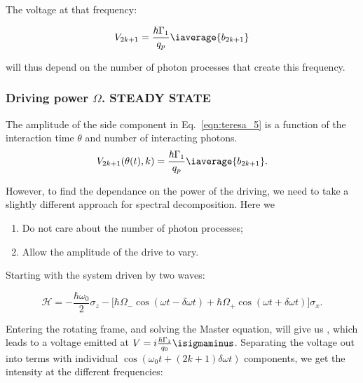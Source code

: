       The voltage at that frequency:
	
	\begin{equation}\label{eqn:teresa_5}
          V_{2k+1}=\frac{\hbar\Gamma_1}{q_p}\iaverage{b_{2k+1}}
	\end{equation}
	
	\noindent will thus depend  on the number of photon
        processes that create this frequency.
	
	
 \subsubsection{Driving power $ \Omega $. STEADY STATE}
 The    amplitude     of    the    side     component    in
 Eq.~\eqref{eqn:teresa_5} is a  function of the interaction
 time $ \theta $ and number of interacting photons.
 \[
   V_{2k+1}(\theta(t),
   k)=\frac{\hbar\Gamma_1}{q_p}\iaverage{b_{2k+1}}.
 \]
  
 \noindent However, to find the  dependance on the power of
 the driving, we need to take a slightly different approach
 for spectral decomposition. Here we
  
 \begin{enumerate}
 \item Do not care about the number of photon processes;
 \item Allow the amplitude of the drive to vary.
 \end{enumerate}

 Starting with the system driven by two waves:
  
  \begin{equation}\label{key}
    \mathcal{H} = -\frac{\hbar\omega_0}{2}\sigma_z - \bigg[\hbar\Omega_-\cos(\omega t  - \delta\omega t) + \hbar\Omega_+\cos(\omega t  + \delta\omega t)\bigg]\sigma_x.
  \end{equation}
  
  \noindent Entering  the rotating  frame, and  solving the
  Master equation,  will give us \isigmaminus,  which leads
  to          a         voltage          emitted         at
  $     V      =     i\frac{\hbar\Gamma_1}{q_0}\isigmaminus
  $. Separating the voltage  out into terms with individual
  $ \cos(\omega_0  t + (2k+1)\delta\omega t)  $ components,
  we get the intensity at the different frequencies:
  
